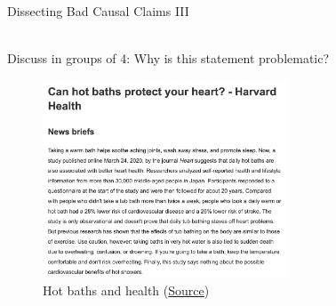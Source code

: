 \documentclass[11pt]{beamer}
\begin{document}
\begin{frame}{Dissecting Bad Causal Claims III}

   \begin{alertblock} {\centering \vspace{-1.5ex} \\ Discuss in groups of 4: Why is this statement problematic?  \\ \vspace{-1.5ex} } \end{alertblock}

\begin{figure}[h!t]
    \centering    \includegraphics[width=0.65\textwidth]{figures/s1_harvard.png}
    \caption{Hot baths and health (\href{https://www.health.harvard.edu/heart-health/can-hot-baths-protect-your-heart}{Source})}
    \label{fig:bath}
\end{figure}

\end{frame}
\end{document}
